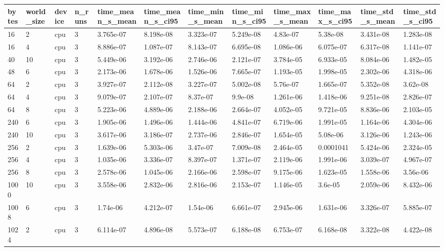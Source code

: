 \begin{tabular}{llllllllllll}
\hline
bytes & world\_size & device & n\_runs & time\_mean\_s\_mean & time\_mean\_s\_ci95 & time\_min\_s\_mean & time\_min\_s\_ci95 & time\_max\_s\_mean & time\_max\_s\_ci95 & time\_std\_s\_mean & time\_std\_s\_ci95 \\
\hline
16 & 2 & cpu & 3 & 3.765e-07 & 8.198e-08 & 3.323e-07 & 5.249e-08 & 4.83e-07 & 5.38e-08 & 3.431e-08 & 1.283e-08 \\
16 & 4 & cpu & 3 & 8.886e-07 & 1.087e-07 & 8.143e-07 & 6.695e-08 & 1.086e-06 & 6.075e-07 & 6.317e-08 & 1.141e-07 \\
40 & 10 & cpu & 3 & 5.449e-06 & 3.192e-06 & 2.746e-06 & 2.121e-07 & 3.784e-05 & 6.933e-05 & 8.084e-06 & 1.482e-05 \\
48 & 6 & cpu & 3 & 2.173e-06 & 1.678e-06 & 1.526e-06 & 7.665e-07 & 1.193e-05 & 1.998e-05 & 2.302e-06 & 4.318e-06 \\
64 & 2 & cpu & 3 & 3.927e-07 & 2.112e-08 & 3.227e-07 & 5.002e-08 & 5.76e-07 & 1.665e-07 & 5.352e-08 & 3.62e-08 \\
64 & 4 & cpu & 3 & 9.079e-07 & 2.107e-07 & 8.37e-07 & 9.9e-08 & 1.261e-06 & 1.418e-06 & 9.251e-08 & 2.826e-07 \\
64 & 8 & cpu & 3 & 5.223e-06 & 4.889e-06 & 2.188e-06 & 2.664e-07 & 4.052e-05 & 9.721e-05 & 8.836e-06 & 2.103e-05 \\
240 & 6 & cpu & 3 & 1.905e-06 & 1.496e-06 & 1.444e-06 & 4.841e-07 & 6.719e-06 & 1.991e-05 & 1.164e-06 & 4.304e-06 \\
240 & 10 & cpu & 3 & 3.617e-06 & 3.186e-07 & 2.737e-06 & 2.846e-07 & 1.654e-05 & 5.08e-06 & 3.126e-06 & 1.243e-06 \\
256 & 2 & cpu & 3 & 1.639e-06 & 5.303e-06 & 3.47e-07 & 7.009e-08 & 2.464e-05 & 0.0001041 & 5.424e-06 & 2.324e-05 \\
256 & 4 & cpu & 3 & 1.035e-06 & 3.336e-07 & 8.397e-07 & 1.371e-07 & 2.119e-06 & 1.991e-06 & 3.039e-07 & 4.967e-07 \\
256 & 8 & cpu & 3 & 2.578e-06 & 1.045e-06 & 2.166e-06 & 2.598e-07 & 9.175e-06 & 1.623e-05 & 1.558e-06 & 3.56e-06 \\
1000 & 10 & cpu & 3 & 3.558e-06 & 2.832e-06 & 2.816e-06 & 2.153e-07 & 1.146e-05 & 3.6e-05 & 2.059e-06 & 8.432e-06 \\
1008 & 6 & cpu & 3 & 1.74e-06 & 4.212e-07 & 1.54e-06 & 6.661e-07 & 2.945e-06 & 1.631e-06 & 3.326e-07 & 5.885e-07 \\
1024 & 2 & cpu & 3 & 6.114e-07 & 4.896e-08 & 5.573e-07 & 6.188e-08 & 6.753e-07 & 6.168e-08 & 3.322e-08 & 4.422e-08 \\

\end{tabular}
